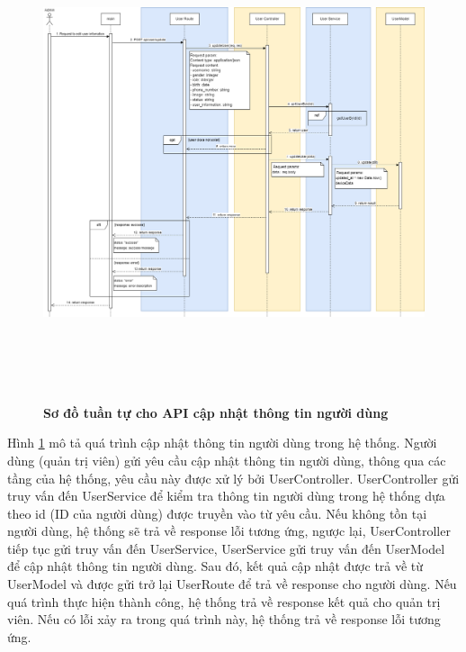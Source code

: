 \begin{figure}[H]
  \centering
  \includegraphics[width=16cm,height=14cm]{Images/sequence_api/editUser.png}
  \caption[Sơ đồ tuần tự cho API cập nhật thông tin người dùng ]{\bfseries \fontsize{12pt}{0pt}
  \selectfont Sơ đồ tuần tự cho API cập nhật thông tin người dùng }
  \label{updateUserById} %
\end{figure}
Hình \ref{updateUserById} mô tả quá trình cập nhật thông tin người dùng trong hệ thống. Người dùng (quản trị viên) gửi yêu cầu cập nhật thông tin người dùng, thông qua các tầng của hệ thống, 
yêu cầu này được xử lý bởi UserController. UserController gửi truy vấn đến UserService để kiểm tra thông tin người dùng trong hệ thống dựa theo id (ID của người dùng) được truyền vào từ yêu cầu. 
Nếu không tồn tại người dùng, hệ thống sẽ trả về response lỗi tương ứng, ngược lại, UserController tiếp tục gửi truy vấn đến UserService, UserService gửi truy vấn đến UserModel để cập nhật thông tin
người dùng. Sau đó, kết quả cập nhật được trả về từ UserModel và được gửi trở lại UserRoute để trả về response cho người dùng. Nếu quá trình thực hiện thành công, hệ thống trả về response kết quả cho quản trị viên. Nếu có lỗi xảy ra
 trong quá trình này, hệ thống trả về response lỗi tương ứng.


